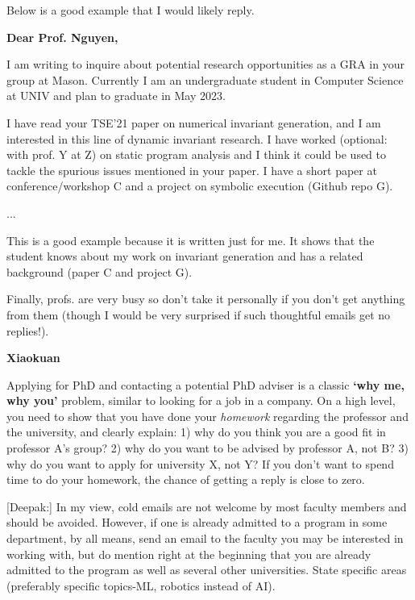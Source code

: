 \documentclass[oneside,11pt,dvipsnames]{book}
\newenvironment{commentbox}[1][]{
  \small
  \begin{mybox}
    {\small \textbf{#1}}
  }{
  \end{mybox}
}
\begin{document}
Below is a good example that I would likely reply.

\begin{commentbox}[Dear Prof. Nguyen,]

  I am writing to inquire about potential research opportunities as a GRA in your group at Mason. Currently I am an undergraduate student in Computer Science at UNIV and plan to graduate in May 2023.


  I have read your TSE'21 paper on numerical invariant generation, and I am interested in this line of dynamic invariant research. I have worked (optional: with prof. Y at Z) on static program analysis and I think it could be used to tackle the spurious issues mentioned in your paper. I have a short paper at conference/workshop C and a project on symbolic execution (Github repo G).

  ...

  This is a good example because it is written just for me.  It shows that the student knows about my work on invariant generation and has a related background (paper C and project G).
\end{commentbox}

Finally, profs. are very busy so don't take it personally if you don't get anything from them (though I would be very surprised if such thoughtful emails get no replies!).


\begin{commentbox}[Xiaokuan]
  Applying for PhD and contacting a potential PhD adviser is a classic \textbf{`why me, why you'} problem,
  similar to looking for a job in a company.
  On a high level,
  you need to show that you have done your \emph{homework}
  regarding the professor and the university,
  and clearly explain:
  1) why do you think you are a good fit in professor A's group?
  2) why do you want to be advised by professor A, not B?
  3) why do you want to apply for university X, not Y?
  If you don't want to spend time to do your homework,
  the chance of getting a reply is close to zero.
\end{commentbox}


\begin{commentbox}
  [Deepak:]
  In my view, cold emails are not welcome by most faculty members and should be avoided. However, if one is already admitted to a program in some department, by all means, send an email to the faculty you may be interested in working with, but do mention right at the beginning that you are already admitted to the program as well as several other universities. State specific areas (preferably specific topics-ML, robotics instead of AI).
\end{commentbox}
\end{document}
